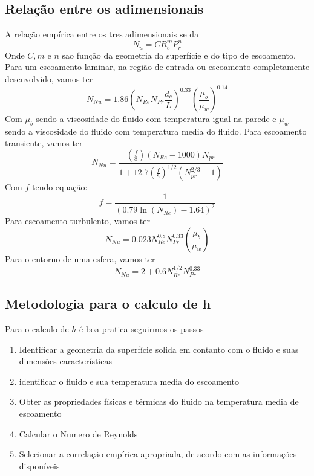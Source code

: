 \subsection{Relação entre os adimensionais}
A relação empírica entre os tres adimensionais se da
\begin{equation}
    N_u = C R_e^m P_r^n
\end{equation}
Onde \(C, m\) e \(n\) sao função da geometria da superfície e do tipo de escoamento. Para um
escoamento laminar, na região de entrada ou escoamento completamente desenvolvido, vamos ter
\begin{equation}
    N_{Nu} = 1.86 \left(N_{Re} N_{Pr} \frac{d_c}{L} \right)^{0.33} \left(\frac{\mu_b}{\mu_w} \right)^{0.14}
\end{equation}
Com \(\mu_b\) sendo a viscosidade do fluido com temperatura igual na parede e \(\mu_w\) sendo a
viscosidade do fluido com temperatura media do fluido. 
Para escoamento transiente, vamos ter
\begin{equation}
    N_{Nu} = \frac{(\frac{f}{8})(N_{Re} - 1000)N_{pr}}{1 + 12.7(\frac{f}{8})^{1/2}(N_{pr}^{2/3} - 1)}
\end{equation}
Com \(f\) tendo equação:
\begin{equation}
    f = \frac{1}{(0.79 \ln(N_{Re}) - 1.64)^2}
\end{equation}
Para escoamento turbulento, vamos ter
\begin{equation}
    N_{Nu} = 0.023 N_{Re}^{0.8} N_{Pr}^{0.33}\left(\frac{\mu_b}{\mu_w} \right)
\end{equation}
Para o entorno de uma esfera, vamos ter
\begin{equation}
    N_{Nu} = 2 + 0.6 N_{Re}^{1/2} N_{Pr}^{0.33}
\end{equation}
\subsection{Metodologia para o calculo de h}
Para o calculo de \(h\) é boa pratica seguirmos os passos
\begin{enumerate}
    \item {Identificar a geometria da superfície solida em contanto com o fluido e suas dimensões características}
    \item {identificar o fluido e sua temperatura media do escoamento}
    \item {Obter as propriedades físicas e térmicas do fluido na temperatura media de escoamento}
    \item {Calcular o Numero de Reynolds}
    \item {Selecionar a correlação empírica apropriada, de acordo com as informações disponíveis}
\end{enumerate}

